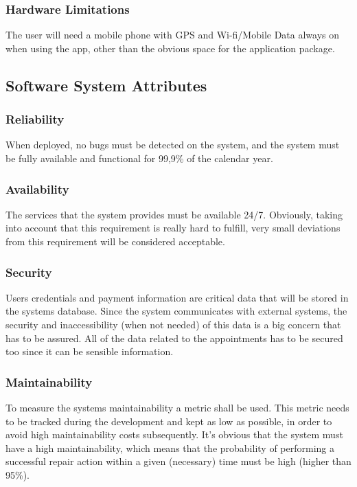 \documentclass[12pt]{article}
\begin{document}
\subsubsection{Hardware Limitations}
The user will need a mobile phone with GPS and Wi-fi/Mobile Data always on when using the app, other than the obvious space for the application package.

\subsection{Software System Attributes}

\subsubsection{Reliability}
When deployed, no bugs must be detected on the system, and the system must be fully available and functional for 99,9\% of the calendar year. 

\subsubsection{Availability}
The services that the system provides must be available 24/7. Obviously, taking into account that this requirement is really hard to fulfill, very small deviations from this requirement will be considered acceptable.

\subsubsection{Security}
Users credentials and payment information are critical data that will be stored in the systems database. Since the system communicates with external systems, the security and inaccessibility (when not needed) of this data is a big concern that has to be assured. All of the data related to the appointments has to be secured too since it can be sensible information. 

\subsubsection{Maintainability}
To measure the systems maintainability a metric shall be used. This metric needs to be tracked during the development and kept as low as possible, in order to avoid high maintainability costs subsequently. It's obvious that the system must have a high maintainability, which means that the probability of performing a successful repair action within a given (necessary) time must be high (higher than 95\%).
\end{document}
